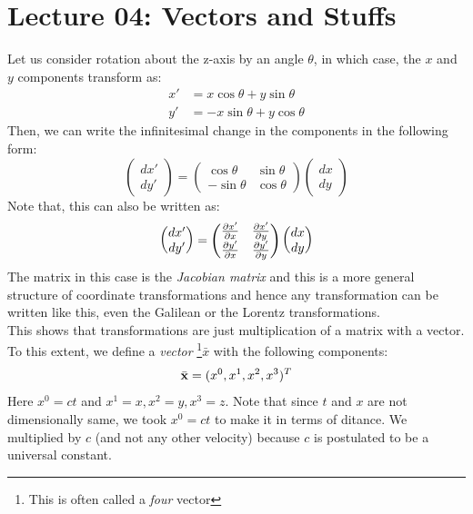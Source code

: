\section*{Lecture 04: Vectors and Stuffs}
Let us consider rotation about the z-axis by an angle $\theta$, in which case, the $x$ and $y$ components transform as: 
\begin{align*}
    x' &= x\cos\theta + y\sin\theta \\
    y' &= -x\sin\theta + y\cos\theta
\end{align*}
Then, we can write the infinitesimal change in the components in the following form:
$$\begin{pmatrix}
    dx'\\dy' 
\end{pmatrix} = \begin{pmatrix}
    \cos\theta & \sin\theta\\
    -\sin\theta & \cos\theta
\end{pmatrix}\begin{pmatrix}
    dx\\dy
\end{pmatrix}$$
Note that, this can also be written as:
$$\begin{pmatrix}
    dx'\\dy' 
\end{pmatrix} = \begin{pmatrix}
    \pdv{x'}{x} & \pdv{x'}{y}\\
    \pdv{y'}{x} & \pdv{y'}{y}
\end{pmatrix}\begin{pmatrix}
    dx\\dy
\end{pmatrix}$$
The matrix in this case is the \textit{Jacobian matrix} and this is a more general structure of coordinate transformations and hence any transformation can be written like this, even the Galilean or the Lorentz transformations. \\[0.2cm]
This shows that transformations are just multiplication of a matrix with a vector. To this extent, we define a \textit{vector} \footnote{This is often called a \textit{four} vector}$\bar{x}$ with the following components:
$$\bar{\vb{x}} =(x^0, x^1,x^2,x^3)^T$$
Here $x^0 = ct$ and $x^1=x, x^2=y, x^3=z$. Note that since $t$ and $x$ are not dimensionally same, we took $x^0=ct$ to make it in terms of ditance. We multiplied by $c$ (and not any other velocity) because $c$ is postulated to be a universal constant. \\[0.2cm]
